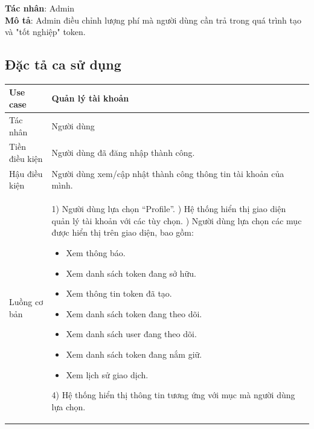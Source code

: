 \hspace{-1cm}\textbf{Tác nhân}: Admin \\
\textbf{Mô tả}: Admin điều chỉnh lượng phí mà người dùng cần trả trong quá
trình tạo và "tốt nghiệp" token.

\subsection{Đặc tả ca sử dụng}

\begin{table}[H]
    \centering
    \begin{tabular}{|p{5cm}|p{8cm}|}
        \hline
        Use case                                      & Quản lý tài khoản                                          \\
        \hline
        Tác nhân                                      & Người dùng                                                 \\
        \hline
        Tiền điều kiện                                & Người dùng đã đăng nhập thành công.                        \\
        \hline
        Hậu điều kiện                                 & Người dùng xem/cập nhật thành công thông tin tài khoản của
        mình.                                                                                                      \\
        \hline
        Luồng cơ bản                                  & 1) Người dùng lựa chọn ``Profile''. \newline
        2) Hệ thống hiển thị giao diện quản lý tài khoản với các tùy chọn. \newline
        3) Người dùng lựa chọn các mục được hiển thị trên giao diện, bao gồm:
        \begin{itemize}[leftmargin=1.5em, nosep]
            \item Xem thông báo.
            \item Xem danh sách token đang sở hữu.
            \item Xem thông tin token đã tạo.
            \item Xem danh sách token đang theo dõi.
            \item Xem danh sách user đang theo dõi.
            \item Xem danh sách token đang nắm giữ.
            \item Xem lịch sử giao dịch.
        \end{itemize}
        4) Hệ thống hiển thị thông tin tương ứng với mục mà người dùng lựa chọn.                                   \\

\end{tabular}
\end{table}
